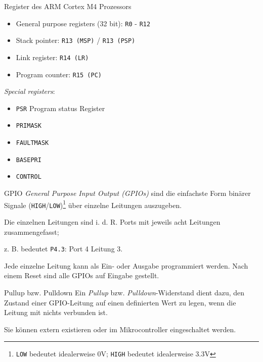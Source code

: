 \begin{defi}{Register des ARM Cortex M4 Prozessors}
    \begin{itemize}
        \item General purpose registers (32 bit): \texttt{R0} - \texttt{R12}
        \item Stack pointer: \texttt{R13 (MSP)} / \texttt{R13 (PSP)}
        \item Link register: \texttt{R14 (LR)}
        \item Program counter: \texttt{R15 (PC)}
    \end{itemize}

    \emph{Special registers}:
    \begin{itemize}
        \item \texttt{PSR} Program status Register
        \item \texttt{PRIMASK}
        \item \texttt{FAULTMASK}
        \item \texttt{BASEPRI}
        \item \texttt{CONTROL}
    \end{itemize}
\end{defi}

\begin{defi}{GPIO}
    \emph{General Purpose Input Output (GPIOs)} sind die einfachste Form binärer Signale (\texttt{HIGH}/\texttt{LOW})\footnote{\texttt{LOW} bedeutet idealerweise 0V; \texttt{HIGH} bedeutet idealerweise 3.3V} über einzelne Leitungen auszugeben.

    Die einzelnen Leitungen sind i. d. R. Ports mit jeweils acht Leitungen zusammengefasst;

    z. B. bedeutet \texttt{P4.3}: Port 4 Leitung 3.

    Jede einzelne Leitung kann als Ein- oder Ausgabe programmiert werden.
    Nach einem Reset sind alle GPIOs auf Eingabe gestellt.
\end{defi}

\begin{bonus}{Pullup bzw. Pulldown}
    Ein \emph{Pullup} bzw. \emph{Pulldown}-Widerstand dient dazu, den Zustand einer GPIO-Leitung auf einen definierten Wert zu legen, wenn die Leitung mit nichts verbunden ist.

    Sie können extern existieren oder im Mikrocontroller eingeschaltet werden.
\end{bonus}